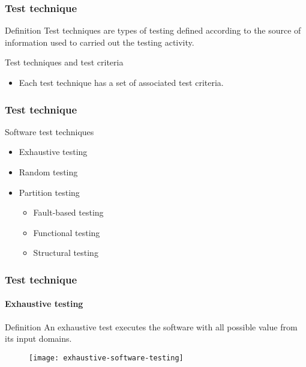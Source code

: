 \begin{frame}[parent={cmap:software-testing},hasnext=true,hasprev=true]
\frametitle{Test technique}
\label{concept:test-technique}

\begin{block:concept}{Definition}
Test techniques are types of testing defined according to the
source of information used to carried out the testing activity.
\end{block:concept}

\begin{block:fact}{Test techniques and test criteria}
\begin{itemize}
    \item Each test technique has a set of associated test criteria.
\end{itemize}
\end{block:fact}
\end{frame}



\begin{frame}
\frametitle{Test technique}

\begin{block:fact}{Software test techniques}
\begin{itemize}
	\item Exhaustive testing

	\item Random testing

	\item Partition testing
	\begin{itemize}
		\item Fault-based testing

		\item Functional testing

		\item Structural testing
	\end{itemize}
\end{itemize}
\end{block:fact}
\end{frame}



\begin{frame}
\frametitle{Test technique}
\framesubtitle{Exhaustive testing}
\label{concept:exhaustive-testing}

\begin{block:concept}{Definition}
An exhaustive test executes the software with all possible value from its
input domains.
\end{block:concept}

\begin{figure}
    \centering
    \texttt{[image: exhaustive-software-testing]}
\end{figure}

\hfill
{}
\end{frame}



